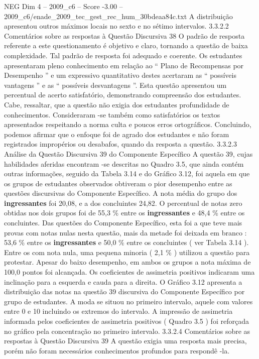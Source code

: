 \begin{textsample}{NEG Dim 4 – 2009\_c6 – Score -3.00 – 2009\_c6/enade\_2009\_tec\_gest\_rec\_hum\_30bdeaa84c.txt}
A distribuição apresentou outros máximos locais no sexto e no sétimo intervalos. 3.3.2.2 Comentários sobre as respostas à Questão Discursiva 38 O padrão de resposta referente a este questionamento é objetivo e claro, tornando a questão de baixa complexidade.
Tal padrão de resposta foi adequado e coerente.
Os estudantes apresentaram pleno conhecimento em relação ao “ Plano de Recompensas por Desempenho ” e um expressivo quantitativo destes acertaram as “ possíveis vantagens ” e as “ possíveis desvantagens ”.
Esta questão apresentou um percentual de acerto satisfatório, demonstrando compreensão dos estudantes.
Cabe, ressaltar, que a questão não exigia dos estudantes profundidade de conhecimentos.
Consideraram -se também como satisfatórios os textos apresentados respeitando a norma culta e poucos erros ortográficos.
Concluindo, podemos afirmar que o enfoque foi de agrado dos estudantes e não foram registrados impropérios ou desabafos, quando da resposta a questão. 3.3.2.3 Análise da Questão Discursiva 39 do Componente Específico A questão 39, cujas habilidades aferidas encontram -se descritas no Quadro 3.5, que ainda contém outras informações, seguido da Tabela 3.14 e do Gráfico 3.12, foi aquela em que os grupos de estudantes observados obtiveram o pior desempenho entre as questões discursivas do Componente Específico.
A nota média do grupo dos \textbf{ingressantes} foi 20,08, e a dos concluintes 24,82.
O percentual de notas zero obtidas nos dois grupos foi de 55,3 \% entre os \textbf{ingressantes} e 48,4 \% entre os concluintes.
Das questões do Componente Específico, esta foi a que teve mais provas com notas nulas nesta questão, mais da metade foi deixada em branco : 53,6 \% entre os \textbf{ingressantes} e 50,0 \% entre os concluintes ( ver Tabela 3.14 ).
Entre os com nota nula, uma pequena minoria ( 2,1 \% ) utilizou a questão para protestar.
Apesar do baixo desempenho, em ambos os grupos a nota máxima de 100,0 pontos foi alcançada.
Os coeficientes de assimetria positivos indicaram uma inclinação para a esquerda e cauda para a direita.
O Gráfico 3.12 apresenta a distribuição das notas na questão 39 discursiva do Componente Específico por grupo de estudantes.
A moda se situou no primeiro intervalo, aquele com valores entre 0 e 10 incluindo os extremos do intervalo.
A impressão de assimetria informada pelos coeficientes de assimetria positivos ( Quadro 3.5 ) foi reforçada no gráfico pela concentração no primeiro intervalo. 3.3.2.4 Comentários sobre as respostas à Questão Discursiva 39 A questão exigia uma resposta mais precisa, porém não foram necessários conhecimentos profundos para respondê -la.

\end{textsample}
